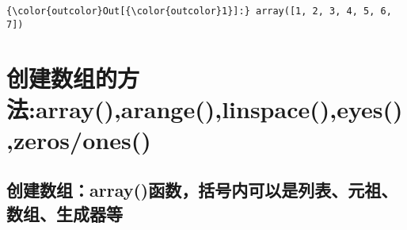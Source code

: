 \documentclass[11pt]{article}
\begin{document}
\begin{Verbatim}[commandchars=\\\{\}]
{\color{outcolor}Out[{\color{outcolor}1}]:} array([1, 2, 3, 4, 5, 6, 7])
\end{Verbatim}
            
    \section{创建数组的方法:array(),arange(),linspace(),eyes(),zeros/ones()}\label{ux521bux5efaux6570ux7ec4ux7684ux65b9ux6cd5arrayarangelinspaceeyeszerosones}

    \subsection{创建数组：array()函数，括号内可以是列表、元祖、数组、生成器等}\label{ux521bux5efaux6570ux7ec4arrayux51fdux6570ux62ecux53f7ux5185ux53efux4ee5ux662fux5217ux8868ux5143ux7956ux6570ux7ec4ux751fux6210ux5668ux7b49}
\end{document}
